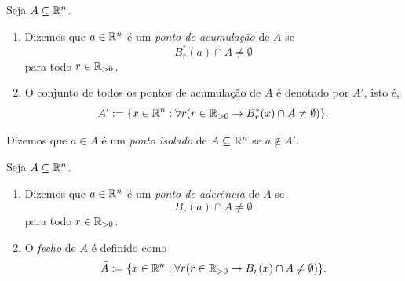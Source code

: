 \begin{definition}
    Seja $A \subseteq \mathbb{R}^n$.
        \begin{enumerate}[leftmargin=*, align=left, label=\textbf{(\alph*)}]
            \item Dizemos que $a \in \mathbb{R}^n$ é um \emph{ponto de acumulação} de $A$ se
                \[
                    B^*_r(a) \cap A \neq \emptyset
                \]
            para todo $r \in \mathbb{R}_{>0}$.
            \item O conjunto de todos os pontos de acumulação de $A$ é denotado por $A'$, isto é,
                \[
                    A' := \{x \in \mathbb{R}^n : \forall r (r \in \mathbb{R}_{>0} \rightarrow B^*_r(x) \cap A \neq \emptyset) \}.
                \]
        \end{enumerate}
\end{definition}

\begin{definition}
    Dizemos que $a \in A$ é um \emph{ponto isolado} de $A \subseteq \mathbb{R}^n$ se $a \notin A'$.
\end{definition}

\begin{definition}
    Seja $A \subseteq \mathbb{R}^n$.
        \begin{enumerate}[leftmargin=*, align=left, label=\textbf{(\alph*)}]
            \item Dizemos que $a \in \mathbb{R}^n$ é um \emph{ponto de aderência} de $A$ se
                \[
                    B_r(a) \cap A \neq \emptyset
                \]
            para todo $r \in \mathbb{R}_{>0}$.
            \item O \emph{fecho} de $A$ é definido como
                \[
                    \bar{A} := \{x \in \mathbb{R}^n : \forall r (r \in \mathbb{R}_{>0} \rightarrow B_r(x) \cap A \neq \emptyset) \}.
                \]
        \end{enumerate}
\end{definition}

